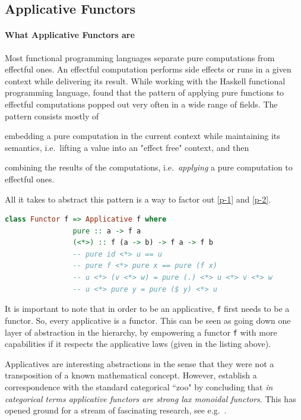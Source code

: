 \documentclass[
  oneside,
  11pt, a4paper,
  footinclude=true,
  headinclude=true,
  cleardoublepage=empty
]{scrbook}
\theoremstyle{definition}
\theoremstyle{definition}
\begin{document}
	    \subsection{Applicative Functors}
	    
	        \paragraph{What Applicative Functors are}
	        
    Most functional programming languages separate pure computations from effectful ones. An effectful computation performs side effects or runs in a given context while delivering its result. While working with the Haskell functional programming language, \cite{mcbride2008applicative} found that the pattern of applying pure functions to effectful computations popped out very often in a wide range of fields. The pattern consists mostly of
	    \begin{inparaenum}
            \item embedding a pure computation in the current context while maintaining its semantics, i.e.\ lifting a value into an "effect free" context,\label{p-1} and then
            \item combining the results of the computations, i.e.\ \emph{applying} a pure computation to effectful ones.\label{p-2}
        \end{inparaenum}
	All it takes to abstract this pattern is a way to factor out \ref{p-1} and \ref{p-2}.
	             
	            \begin{lstlisting}[language=Haskell, caption={Applicative laws},captionpos=b]
            class Functor f => Applicative f where
                pure :: a -> f a
                (<*>) :: f (a -> b) -> f a -> f b
                -- pure id <*> u == u
                -- pure f <*> pure x == pure (f x)
                -- u <*> (v <*> w) = pure (.) <*> u <*> v <*> w
                -- u <*> pure y = pure ($ y) <*> u
	            \end{lstlisting}{}
	            
    It is important to note that in order to be an applicative, \texttt{f} first needs to be a functor. So, every applicative is a functor. This can be seen as going down one layer of abstraction in the hierarchy, by empowering a functor \texttt{f} with more capabilities if it respects the applicative laws (given in the listing above).
	            
	Applicatives are interesting abstractions in the sense that they were not a transposition of a known mathematical concept. However, \cite{mcbride2008applicative} establish a correspondence with the standard categorical ``zoo" by concluding that \emph{in categorical terms applicative functors are strong lax monoidal functors}. This has opened ground for a stream of fascinating research, see e.g.\ \citep{Paterson:2012:CAF:2368298.2368321, Cooper:2008:EFA:1485346.1485361, DBLP:journals/corr/CapriottiK14}.
	        
\end{document}
